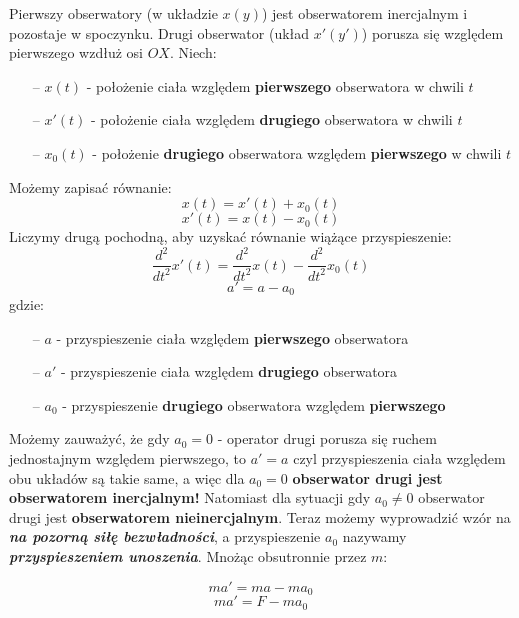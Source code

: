 \documentclass[a4paper]{article}
\begin{document}
    Pierwszy obserwatory (w układzie $x(y)$) jest obserwatorem inercjalnym i pozostaje w spoczynku. 
    Drugi obserwator (układ $x'(y')$) porusza się względem pierwszego wzdłuż osi $OX$.
    Niech:
    \begin{itemize}
        \item [--] $x(t)$ - położenie ciała względem \textbf{pierwszego} obserwatora w chwili $t$
        \item [--] $x'(t)$ - położenie ciała względem \textbf{drugiego} obserwatora w chwili $t$
        \item [--] $x_0(t)$ - położenie \textbf{drugiego} obserwatora względem \textbf{pierwszego} w chwili $t$
    \end{itemize}
    Możemy zapisać równanie:
    \[x(t) = x'(t) + x_0(t)\]
    \[x'(t) = x(t) - x_0(t)\]
    Liczymy drugą pochodną, aby uzyskać równanie wiążące przyspieszenie:
    \[\frac{d^2}{dt^2}x'(t) = \frac{d^2}{dt^2}x(t) - \frac{d^2}{dt^2}x_0(t)\]
    \[a' = a - a_0\]
    gdzie:
    \begin{itemize}
        \item [--] $a$ - przyspieszenie ciała względem \textbf{pierwszego} obserwatora
        \item [--] $a'$ - przyspieszenie ciała względem \textbf{drugiego} obserwatora
        \item [--] $a_0$ - przyspieszenie \textbf{drugiego} obserwatora względem \textbf{pierwszego}
    \end{itemize}
    Możemy zauważyć, że gdy $a_0 = 0$ - operator drugi porusza się ruchem jednostajnym względem pierwszego, 
    to $a' = a$ czyl przyspieszenia ciała względem obu układów są takie same, a więc dla $a_0 = 0$ \textbf{obserwator
    drugi jest obserwatorem inercjalnym!}
    Natomiast dla sytuacji gdy $a_0 \neq 0$ obserwator drugi jest \textbf{obserwatorem nieinercjalnym}. Teraz możemy
    wyprowadzić wzór na \textbf{\em{na pozorną siłę bezwładności}}, a przyspieszenie $a_0$ nazywamy \textbf{\em{przyspieszeniem unoszenia}}. 
    Mnożąc obsutronnie przez $m$:

    \[ma' = ma - ma_0\]
    \[ma' = F - ma_0\]
    
\end{document}
